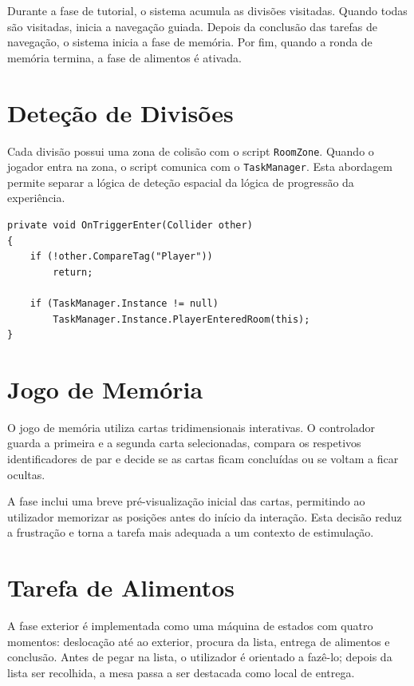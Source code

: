 \documentclass[12pt,a4paper,oneside]{report}
\begin{document}
Durante a fase de tutorial, o sistema acumula as divisões visitadas. Quando todas são visitadas, inicia a navegação guiada. Depois da conclusão das tarefas de navegação, o sistema inicia a fase de memória. Por fim, quando a ronda de memória termina, a fase de alimentos é ativada.

\section{Deteção de Divisões}

Cada divisão possui uma zona de colisão com o script \texttt{RoomZone}. Quando o jogador entra na zona, o script comunica com o \texttt{TaskManager}. Esta abordagem permite separar a lógica de deteção espacial da lógica de progressão da experiência.

\begin{lstlisting}[language=CSharp,caption={Comunicação de entrada numa divisão}]
private void OnTriggerEnter(Collider other)
{
    if (!other.CompareTag("Player"))
        return;

    if (TaskManager.Instance != null)
        TaskManager.Instance.PlayerEnteredRoom(this);
}
\end{lstlisting}

\section{Jogo de Memória}

O jogo de memória utiliza cartas tridimensionais interativas. O controlador guarda a primeira e a segunda carta selecionadas, compara os respetivos identificadores de par e decide se as cartas ficam concluídas ou se voltam a ficar ocultas.

A fase inclui uma breve pré-visualização inicial das cartas, permitindo ao utilizador memorizar as posições antes do início da interação. Esta decisão reduz a frustração e torna a tarefa mais adequada a um contexto de estimulação.

\section{Tarefa de Alimentos}

A fase exterior é implementada como uma máquina de estados com quatro momentos: deslocação até ao exterior, procura da lista, entrega de alimentos e conclusão. Antes de pegar na lista, o utilizador é orientado a fazê-lo; depois da lista ser recolhida, a mesa passa a ser destacada como local de entrega.
\end{document}
